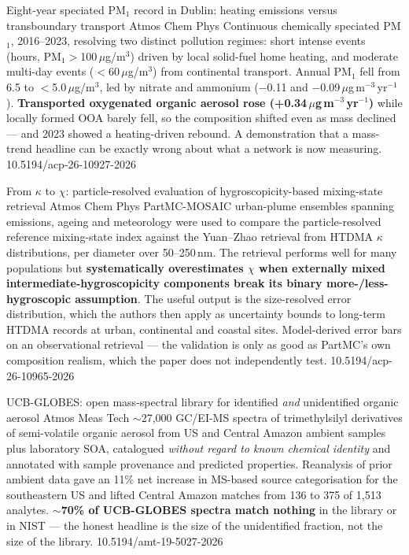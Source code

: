 \documentclass[10pt]{article}
\begin{document}
{Eight-year speciated PM$_1$ record in Dublin: heating emissions versus transboundary transport}
{Atmos Chem Phys}
{Continuous chemically speciated PM$_1$, 2016--2023, resolving two distinct pollution
regimes: short intense events (hours, PM$_1>$100\,$\mu$g/m$^3$) driven by local solid-fuel
home heating, and moderate multi-day events ($<$60\,$\mu$g/m$^3$) from continental
transport. Annual PM$_1$ fell from 6.5 to $<$5.0\,$\mu$g/m$^3$, led by nitrate and
ammonium ($-$0.11 and $-$0.09\,$\mu$g\,m$^{-3}$\,yr$^{-1}$). \textbf{Transported
oxygenated organic aerosol rose (+0.34\,$\mu$g\,m$^{-3}$\,yr$^{-1}$)} while locally formed
OOA barely fell, so the composition shifted even as mass declined --- and 2023 showed a
heating-driven rebound. A demonstration that a mass-trend headline can be exactly wrong
about what a network is now measuring.}
{10.5194/acp-26-10927-2026}

{From $\kappa$ to $\chi$: particle-resolved evaluation of hygroscopicity-based mixing-state retrieval}
{Atmos Chem Phys}
{PartMC-MOSAIC urban-plume ensembles spanning emissions, ageing and meteorology were used
to compare the particle-resolved reference mixing-state index against the Yuan--Zhao
retrieval from HTDMA $\kappa$ distributions, per diameter over 50--250\,nm. The retrieval
performs well for many populations but \textbf{systematically overestimates $\chi$ when
externally mixed intermediate-hygroscopicity components break its binary
more-/less-hygroscopic assumption}. The useful output is the size-resolved error
distribution, which the authors then apply as uncertainty bounds to long-term HTDMA
records at urban, continental and coastal sites. Model-derived error bars on an
observational retrieval --- the validation is only as good as PartMC's own composition
realism, which the paper does not independently test.}
{10.5194/acp-26-10965-2026}

{UCB-GLOBES: open mass-spectral library for identified \emph{and} unidentified organic aerosol}
{Atmos Meas Tech}
{$\sim$27{,}000 GC/EI-MS spectra of trimethylsilyl derivatives of semi-volatile organic
aerosol from US and Central Amazon ambient samples plus laboratory SOA, catalogued
\emph{without regard to known chemical identity} and annotated with sample provenance and
predicted properties. Reanalysis of prior ambient data gave an 11\% net increase in
MS-based source categorisation for the southeastern US and lifted Central Amazon matches
from 136 to 375 of 1{,}513 analytes. \textbf{$\sim$70\% of UCB-GLOBES spectra match
nothing} in the library or in NIST --- the honest headline is the size of the unidentified
fraction, not the size of the library.}
{10.5194/amt-19-5027-2026}
\end{document}
